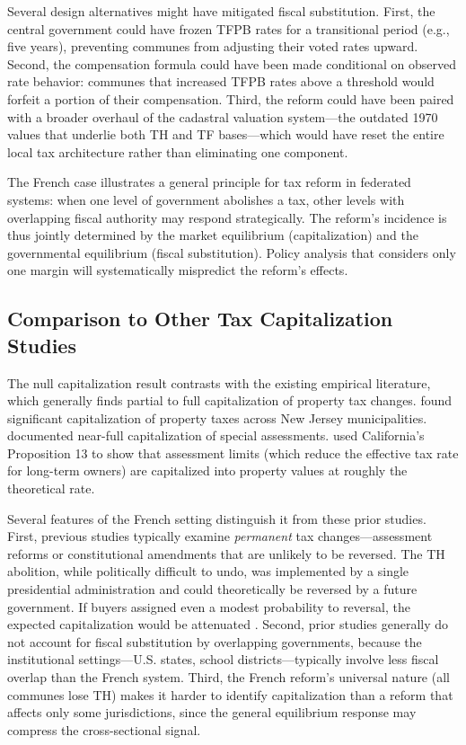 \documentclass[12pt]{article}
\begin{document}
Several design alternatives might have mitigated fiscal substitution. First, the central government could have frozen TFPB rates for a transitional period (e.g., five years), preventing communes from adjusting their voted rates upward. Second, the compensation formula could have been made conditional on observed rate behavior: communes that increased TFPB rates above a threshold would forfeit a portion of their compensation. Third, the reform could have been paired with a broader overhaul of the cadastral valuation system---the outdated 1970 values that underlie both TH and TF bases---which would have reset the entire local tax architecture rather than eliminating one component.

The French case illustrates a general principle for tax reform in federated systems: when one level of government abolishes a tax, other levels with overlapping fiscal authority may respond strategically. The reform's incidence is thus jointly determined by the market equilibrium (capitalization) and the governmental equilibrium (fiscal substitution). Policy analysis that considers only one margin will systematically mispredict the reform's effects.

\subsection{Comparison to Other Tax Capitalization Studies}

The null capitalization result contrasts with the existing empirical literature, which generally finds partial to full capitalization of property tax changes. \citet{oates1969} found significant capitalization of property taxes across New Jersey municipalities. \citet{palmon1998} documented near-full capitalization of special assessments. \citet{lutz2015} used California's Proposition 13 to show that assessment limits (which reduce the effective tax rate for long-term owners) are capitalized into property values at roughly the theoretical rate.

Several features of the French setting distinguish it from these prior studies. First, previous studies typically examine \emph{permanent} tax changes---assessment reforms or constitutional amendments that are unlikely to be reversed. The TH abolition, while politically difficult to undo, was implemented by a single presidential administration and could theoretically be reversed by a future government. If buyers assigned even a modest probability to reversal, the expected capitalization would be attenuated \citep{hilber2017}. Second, prior studies generally do not account for fiscal substitution by overlapping governments, because the institutional settings---U.S. states, school districts---typically involve less fiscal overlap than the French system. Third, the French reform's universal nature (all communes lose TH) makes it harder to identify capitalization than a reform that affects only some jurisdictions, since the general equilibrium response may compress the cross-sectional signal.
\end{document}
